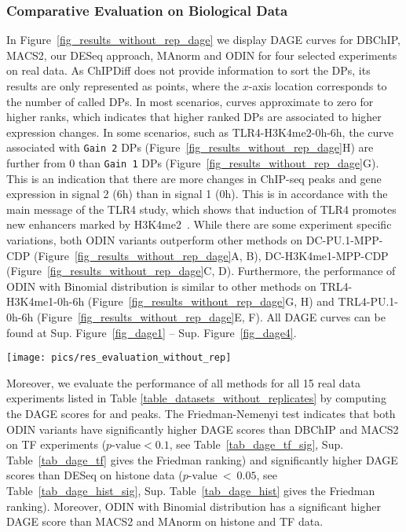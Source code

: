 \subsubsection{Comparative Evaluation on Biological Data}
In Figure~\ref{fig_results_without_rep_dage} we display DAGE curves for DBChIP, MACS2, our DESeq approach, MAnorm and ODIN for four selected experiments on real data. 
As ChIPDiff does not provide information to sort the DPs, its results are only represented as points, where the $x$-axis location corresponds to the number of called DPs. 
In most scenarios, curves approximate to zero for higher ranks, which indicates that higher ranked DPs are associated to higher expression changes. 
In some scenarios, such as TLR4-H3K4me2-0h-6h, the curve associated with {\tt Gain 2} DPs (Figure~\ref{fig_results_without_rep_dage}H) are further from 0 than {\tt Gain 1} DPs (Figure~\ref{fig_results_without_rep_dage}G). 
This is an indication that there are more changes in ChIP-seq peaks and gene expression in signal 2 (6h) than in signal 1 (0h). 
This is in accordance with the main message of the TLR4 study, which shows that induction of TLR4 promotes new enhancers marked by H3K4me2~\citep{kaikonnen2013}. 
While there are some experiment specific variations, both ODIN variants outperform other methods on DC-PU.1-MPP-CDP (Figure~\ref{fig_results_without_rep_dage}A, B), DC-H3K4me1-MPP-CDP (Figure~\ref{fig_results_without_rep_dage}C, D).
Furthermore, the performance of ODIN with Binomial distribution is similar to other methods on TRL4-H3K4me1-0h-6h (Figure~\ref{fig_results_without_rep_dage}G, H) and TRL4-PU.1-0h-6h (Figure~\ref{fig_results_without_rep_dage}E, F).
All DAGE curves can be found at Sup. Figure~\ref{fig_dage1} -- Sup. Figure~\ref{fig_dage4}.

\begin{figure*}[ht]
  \begin{center}
  \centering
   \texttt{[image: pics/res\_evaluation\_without\_rep]}
  \end{center}
\caption[Selection of DAGE curves]{Here we depict the DAGE curves for selected experiments from TLR4 and DC studies. 
Lines in the first and third row represent DP gained in the first signal (), while lines in the second and fourth row in the second signal (). 
}
\label{fig_results_without_rep_dage}
\end{figure*}


Moreover, we evaluate the performance of all methods for all 15 real data experiments  listed in Table \ref{table_datasets_without_replicates}  by computing the DAGE scores for  and  peaks. 
The Friedman-Nemenyi test indicates that both ODIN variants have significantly higher DAGE scores than DBChIP and MACS2 on TF experiments ($p\text{-value} < 0.1$, see Table~\ref{tab_dage_tf_sig}, Sup. Table~\ref{tab_dage_tf} gives the Friedman ranking) and significantly higher DAGE scores than DESeq on histone data ($p\text{-value}~<~0.05$, see Table~\ref{tab_dage_hist_sig}, Sup. Table~\ref{tab_dage_hist} gives the Friedman ranking). 
Moreover, ODIN with Binomial distribution has a significant higher DAGE score than MACS2 and MAnorm on histone and TF data. 

